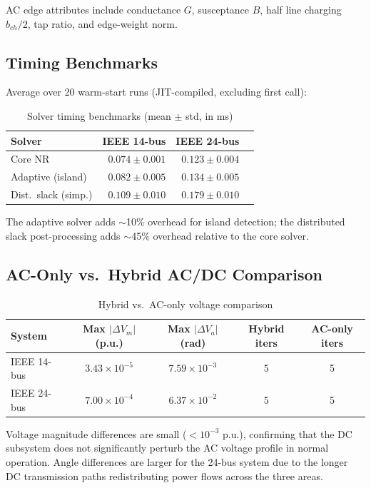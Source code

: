 \documentclass[11pt]{article}
\begin{document}
AC edge attributes include conductance $G$, susceptance $B$, half line charging $b_{ch}/2$, tap ratio, and edge-weight norm.

\subsection{Timing Benchmarks}

Average over 20 warm-start runs (JIT-compiled, excluding first call):

\begin{table}[h]
\centering
\caption{Solver timing benchmarks (mean $\pm$ std, in ms)}
\label{tab:timing}
\begin{tabular}{l r r r}
\toprule
Solver & IEEE 14-bus & IEEE 24-bus \\
\midrule
Core NR              & $0.074 \pm 0.001$ & $0.123 \pm 0.004$ \\
Adaptive (island)    & $0.082 \pm 0.005$ & $0.134 \pm 0.005$ \\
Dist.\ slack (simp.) & $0.109 \pm 0.010$ & $0.179 \pm 0.010$ \\
\bottomrule
\end{tabular}
\end{table}

The adaptive solver adds $\sim$10\% overhead for island detection; the distributed slack post-processing adds $\sim$45\% overhead relative to the core solver.

\subsection{AC-Only vs.\ Hybrid AC/DC Comparison}

\begin{table}[h]
\centering
\caption{Hybrid vs.\ AC-only voltage comparison}
\label{tab:hybrid_vs_ac}
\begin{tabular}{l c c c c}
\toprule
System & Max $|\Delta V_m|$ (p.u.) & Max $|\Delta V_a|$ (rad) & Hybrid iters & AC-only iters \\
\midrule
IEEE 14-bus & $3.43 \times 10^{-5}$ & $7.59 \times 10^{-3}$ & 5 & 5 \\
IEEE 24-bus & $7.00 \times 10^{-4}$ & $6.37 \times 10^{-2}$ & 5 & 5 \\
\bottomrule
\end{tabular}
\end{table}

Voltage magnitude differences are small ($< 10^{-3}$ p.u.), confirming that the DC subsystem does not significantly perturb the AC voltage profile in normal operation. Angle differences are larger for the 24-bus system due to the longer DC transmission paths redistributing power flows across the three areas.
\end{document}
